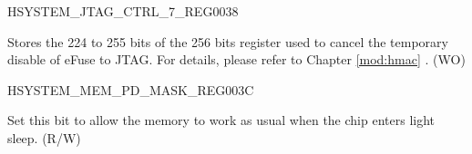 \begin{register}{H}{SYSTEM\_JTAG\_CTRL\_7\_REG}{\hexprefix{}0038}\label{regdesc:SYSTEMJTAGCTRL7REG}
%
\regnewline%
\begin{regdesc}\begin{reglist}
\label{fielddesc:SYSTEMCANCELEFUSEDISABLEJTAGTEMPORARY7}\item [SYSTEM\_CANCEL\_EFUSE\_DISABLE\_JTAG\_TEMPORARY\_7] Stores the 224 to 255 bits of the 256 bits register used to cancel the temporary disable of eFuse to JTAG. For details, please refer to Chapter \ref{mod:hmac} \textit{}. (WO)
\end{reglist}\end{regdesc}
\end{register}


\begin{register}{H}{SYSTEM\_MEM\_PD\_MASK\_REG}{\hexprefix{}003C}\label{regdesc:SYSTEMMEMPDMASKREG}
%
%
\regnewline%
\begin{regdesc}\begin{reglist}
\label{fielddesc:SYSTEMLSLPMEMPDMASK}\item [SYSTEM\_LSLP\_MEM\_PD\_MASK] Set this bit to allow the memory to work as usual when the chip enters light sleep. (R/W)
\end{reglist}\end{regdesc}
\end{register}


